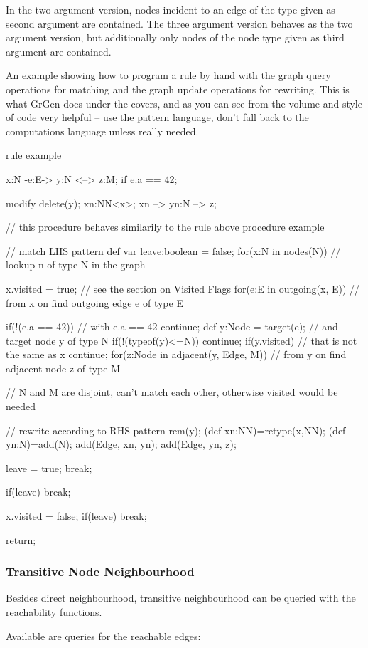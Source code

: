 In the two argument version, nodes incident to an edge of the type given as second argument are contained.
The three argument version behaves as the two argument version, but additionally only nodes of the node type given as third argument are contained.

\begin{example}
An example showing how to program a rule by hand with the graph query operations for matching and the graph update operations for rewriting. This is what GrGen does under the covers, and as you can see from the volume and style of code very helpful -- use the pattern language, don't fall back to the computations language unless really needed.
\begin{grgen}
rule example
{
	x:N -e:E-> y:N <--> z:M;
	if { e.a == 42; }

	modify {
		delete(y);
		xn:NN<x>;
		xn --> yn:N --> z;
	}
}
// this procedure behaves similarily to the rule above
procedure example
{
	// match LHS pattern
	def var leave:boolean = false;
	for(x:N in nodes(N)) // lookup n of type N in the graph
	{
		x.visited = true; // see the section on Visited Flags
		for(e:E in outgoing(x, E)) // from x on find outgoing edge e of type E
		{
			if(!(e.a == 42)) { // with e.a == 42
				continue;
			}
			def y:Node = target(e); // and target node y of type N
			if(!(typeof(y)<=N)) {
				continue;
			}
			if(y.visited) { // that is not the same as x
				continue;
			}
			for(z:Node in adjacent(y, Edge, M)) // from y on find adjacent node z of type M
			{ // N and M are disjoint, can't match each other, otherwise visited would be needed
			
				// rewrite according to RHS pattern
				rem(y);
				(def xn:NN)=retype(x,NN);
				(def yn:N)=add(N);
				add(Edge, xn, yn);
				add(Edge, yn, z);

				leave = true; break;
			}
			if(leave) { break; }
		}
		x.visited = false;
		if(leave) { break; }
	}
	return;
}
\end{grgen}
\end{example}

\subsubsection*{Transitive Node Neighbourhood}\label{transitiveneighbour}

Besides direct neighbourhood, transitive neighbourhood can be queried with the reachability functions.

Available are queries for the reachable edges:

